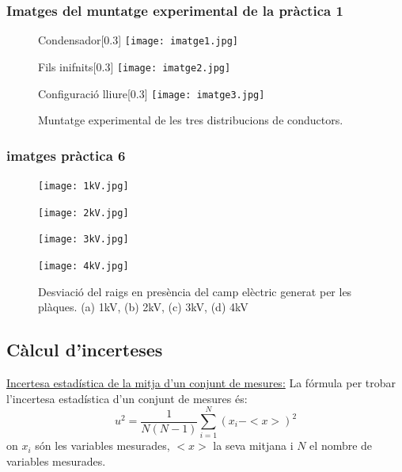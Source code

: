\documentclass[11pt]{article}
\numberwithin{equation}{section}
\numberwithin{figure}{section}
\numberwithin{table}{section}
\begin{document}
\subsubsection{Imatges del muntatge experimental de la pràctica 1}\label{fotos}
\begin{figure}[h!]
    \centering

    \begin{subcaptionbox}{Condensador\label{fig:img1}}[0.3\textwidth]
        {\texttt{[image: imatge1.jpg]}}
    \end{subcaptionbox}
    \hfill
    \begin{subcaptionbox}{Fils inifnits\label{fig:img2}}[0.3\textwidth]
        {\texttt{[image: imatge2.jpg]}}
    \end{subcaptionbox}
    \hfill
    \begin{subcaptionbox}{Configuració lliure\label{fig:img3}}[0.3\textwidth]
        {\texttt{[image: imatge3.jpg]}}
    \end{subcaptionbox}

    \caption{Muntatge experimental de les tres distribucions de conductors.}
    \label{fig:figura3}
\end{figure}
\subsubsection{imatges pràctica 6}
\begin{figure}[h!]
    \centering
    \begin{minipage}{0.38\textwidth}
        \centering
        \texttt{[image: 1kV.jpg]}
    \end{minipage}
    \begin{minipage}{0.38\textwidth}
        \centering
        \texttt{[image: 2kV.jpg]}
    \end{minipage}
    \begin{minipage}{0.38\textwidth}
        \centering
        \texttt{[image: 3kV.jpg]}
    \end{minipage}
    \begin{minipage}{0.38\textwidth}
        \centering
        \texttt{[image: 4kV.jpg]}
    \end{minipage}
    \caption{Desviació del raigs en presència del camp elèctric generat per les plàques. (a) 1kV, (b) 2kV, (c) 3kV, (d) 4kV}
    \label{fig: Desv E}
\end{figure}
\subsection{Càlcul d'incerteses}
\underline{Incertesa estadística de la mitja d'un conjunt de mesures:} La fórmula per trobar l'incertesa estadística d'un conjunt de mesures és:
\begin{equation} \label{eq: incertesa estadística}
    u^2 = \frac{1}{N(N-1)} \sum_{i=1}^{N} (x_i - <x>)^2
\end{equation}
on ${x_i}$ són les variables mesurades, $<x>$ la seva mitjana i $N$ el nombre de variables mesurades.
\end{document}

